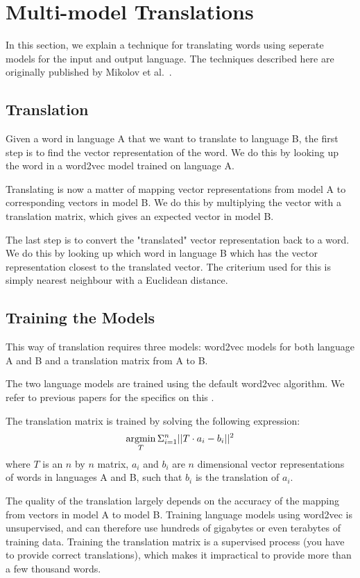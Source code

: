 \section{Multi-model Translations}
\label{sec:multi-model-translations}
In this section, we explain a technique for translating words using seperate models for the input and output language. The techniques described here are originally published by Mikolov et al.~\cite{mikolov2013exploiting}.

\subsection{Translation}
Given a word in language A that we want to translate to language B, the first step is to find the vector representation of the word. We do this by looking up the word in a word2vec model trained on language A.

Translating is now a matter of mapping vector representations from model A to corresponding vectors in model B. We do this by multiplying the vector with a translation matrix, which gives an expected vector in model B.

The last step is to convert the "translated" vector representation back to a word. We do this by looking up which word in language B which has the vector representation closest to the translated vector. The criterium used for this is simply nearest neighbour with a Euclidean distance.

\subsection{Training the Models}
This way of translation requires three models: word2vec models for both language A and B and a translation matrix from A to B.

The two language models are trained using the default word2vec algorithm. We refer to previous papers for the specifics on this \cite{mikolov2013efficient, mikolov2013distributed}.

The translation matrix is trained by solving the following expression:
$$ \argmin_{T} \Sigma_{i=1}^{n} || T \cdot a_i - b_i || ^{2}$$
where $T$ is an $n$ by $n$ matrix, $a_i$ and $b_i$ are $n$ dimensional vector representations of words in languages A and B, such that $b_i$ is the translation of $a_i$.

The quality of the translation largely depends on the accuracy of the mapping from vectors in model A to model B. Training language models using word2vec is unsupervised, and can therefore use hundreds of gigabytes or even terabytes of training data. Training the translation matrix is a supervised process (you have to provide correct translations), which makes it impractical to provide more than a few thousand words.

